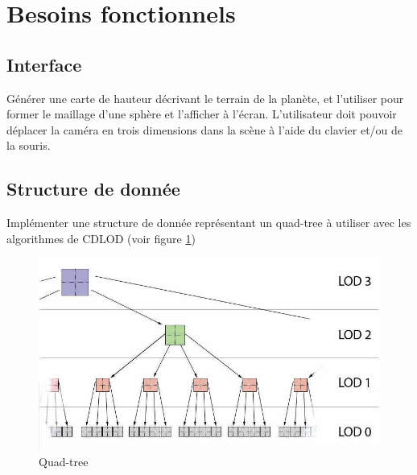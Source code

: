 \documentclass[12pt]{report}
\begin{document}



\section{Besoins fonctionnels}
\subsection{Interface}

Générer une carte de hauteur décrivant le terrain de la planète, et l'utiliser pour former le maillage d'une sphère et l'afficher à l'écran. L'utilisateur doit pouvoir déplacer la caméra en trois dimensions dans la scène à l'aide du clavier et/ou de la souris.

\subsection{Structure de donnée}

Implémenter une structure de donnée représentant un quad-tree à utiliser avec les algorithmes de CDLOD (voir figure \ref{fig:quadtree})

\begin{figure}[!h]
  \includegraphics[scale=0.5]{img/Quadtree.png}
  \caption{Quad-tree}
  \label{fig:quadtree}
\end{figure}
\end{document}
